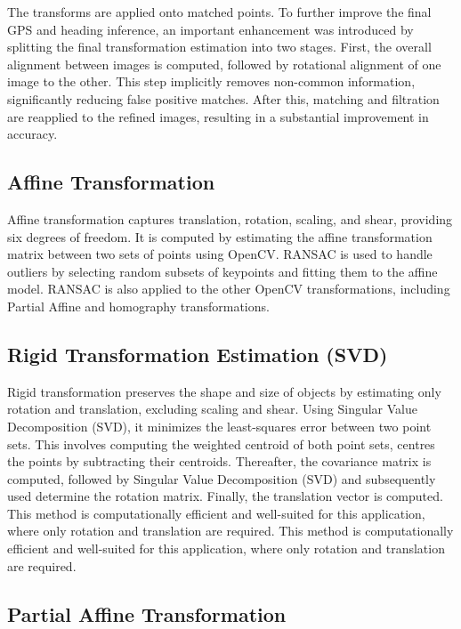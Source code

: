 The transforms are applied onto matched points. To further improve the final GPS and heading inference, an important enhancement was introduced by splitting the final transformation estimation into two stages. First, the overall alignment between images is computed, followed by rotational alignment of one image to the other. This step implicitly removes non-common information, significantly reducing false positive matches. After this, matching and filtration are reapplied to the refined images, resulting in a substantial improvement in accuracy.

\subsection{Affine Transformation}

Affine transformation captures translation, rotation, scaling, and shear, providing six degrees of freedom. It is computed by estimating the affine transformation matrix between two sets of points using OpenCV. RANSAC is used to handle outliers by selecting random subsets of keypoints and fitting them to the affine model. RANSAC is also applied to the other OpenCV transformations, including Partial Affine and homography transformations. \cite{opencv_warp_affine}


\subsection{Rigid Transformation Estimation (SVD)}

Rigid transformation preserves the shape and size of objects by estimating only rotation and translation, excluding scaling and shear. Using Singular Value Decomposition (SVD), it minimizes the least-squares error between two point sets. This involves computing the weighted centroid of both point sets, centres the points by subtracting their centroids. Thereafter, the covariance matrix is computed, followed by Singular Value Decomposition (SVD) and subsequently used determine the rotation matrix. Finally, the translation vector is computed. This method is computationally efficient and well-suited for this application, where only rotation and translation are required. This method is computationally efficient and well-suited for this application, where only rotation and translation are required. \cite{sorkine2017least_squares}


\subsection{Partial Affine Transformation}


